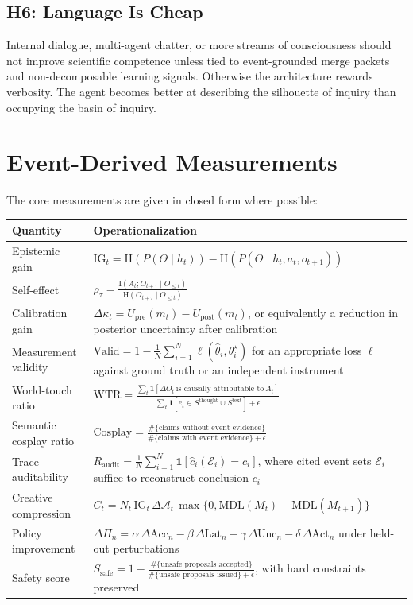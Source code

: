 \documentclass[11pt]{article}
\newcommand{\A}{\mathcal{A}}
\newcommand{\IG}{\mathrm{IG}}
\newcommand{\MI}{\mathrm{I}}
\newcommand{\Ent}{\mathrm{H}}
\newcommand{\MDL}{\mathrm{MDL}}
\newcommand{\Cosplay}{\mathrm{Cosplay}}
\begin{document}
\subsection{H6: Language Is Cheap}

Internal dialogue, multi-agent chatter, or more streams of consciousness should not improve scientific competence unless tied to event-grounded merge packets and non-decomposable learning signals. Otherwise the architecture rewards verbosity. The agent becomes better at describing the silhouette of inquiry than occupying the basin of inquiry.

\section{Event-Derived Measurements}

The core measurements are given in closed form where possible:

\begin{longtable}{>{\raggedright\arraybackslash}p{}>{\raggedright\arraybackslash}p{}}
\toprule
\textbf{Quantity} & \textbf{Operationalization}\\
\midrule
Epistemic gain & $\displaystyle \IG_t=\Ent(P(\Theta\mid h_t)) - \Ent(P(\Theta\mid h_t,a_t,o_{t+1}))$\\
Self-effect & $\displaystyle \rho_\tau=\frac{\MI(A_t;O_{t+\tau}\mid O_{\le t})}{\Ent(O_{t+\tau}\mid O_{\le t})}$\\
Calibration gain & $\displaystyle \Delta\kappa_t = U_{\mathrm{pre}}(m_t)-U_{\mathrm{post}}(m_t)$, or equivalently a reduction in posterior uncertainty after calibration\\
Measurement validity & $\displaystyle \mathrm{Valid}=1-\frac{1}{N}\sum_{i=1}^N \ell(\hat\theta_i,\theta_i^{\star})$ for an appropriate loss $\ell$ against ground truth or an independent instrument\\
World-touch ratio & $\displaystyle \mathrm{WTR}=\frac{\sum_t \mathbf{1}[\Delta O_t\ \text{is causally attributable to}\ A_t]}{\sum_t \mathbf{1}[e_t\in S^{\mathrm{thought}}\cup S^{\mathrm{text}}] + \epsilon}$\\
Semantic cosplay ratio & $\displaystyle \Cosplay=\frac{\#\{\text{claims without event evidence}\}}{\#\{\text{claims with event evidence}\}+\epsilon}$\\
Trace auditability & $\displaystyle R_{\mathrm{audit}}=\frac{1}{N}\sum_{i=1}^N \mathbf{1}[\hat c_i(\mathcal{E}_i)=c_i]$, where cited event sets $\mathcal{E}_i$ suffice to reconstruct conclusion $c_i$\\
Creative compression & $\displaystyle C_t = N_t\,\IG_t\,\Delta \A_t\,\max\{0,\MDL(M_t)-\MDL(M_{t+1})\}$\\
Policy improvement & $\displaystyle \Delta\Pi_n = \alpha\,\Delta\mathrm{Acc}_n - \beta\,\Delta\mathrm{Lat}_n - \gamma\,\Delta\mathrm{Unc}_n - \delta\,\Delta\mathrm{Act}_n$ under held-out perturbations\\
Safety score & $\displaystyle S_{\mathrm{safe}} = 1-\frac{\#\{\text{unsafe proposals accepted}\}}{\#\{\text{unsafe proposals issued}\}+\epsilon}$, with hard constraints preserved\\
\bottomrule
\end{longtable}
\end{document}

